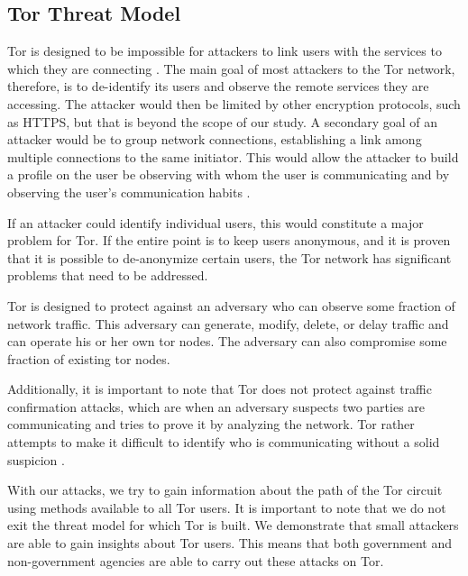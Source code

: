 \documentclass[12pt,journal]{IEEEtran}
\begin{document}
\subsection{Tor Threat Model}
Tor is designed to be impossible for attackers to link users with the services to which they are connecting \cite{Dingledine:2004:TSO:1251375.1251396}. The main goal of most attackers to the Tor network, therefore, is to de-identify its users and observe the remote services they are accessing. The attacker would then be limited by other encryption protocols, such as HTTPS, but that is beyond the scope of our study. A secondary goal of an attacker would be to group network connections, establishing a link among multiple connections to the same initiator. This would allow the attacker to build a profile on the user be observing with whom the user is communicating and by observing the user's communication habits \cite{Murdoch:2005:LTA:1058433.1059390}.
\par
If an attacker could identify individual users, this would constitute a major problem for Tor. If the entire point is to keep users anonymous, and it is proven that it is possible to de-anonymize certain users, the Tor network has significant problems that need to be addressed.
\par
Tor is designed to protect against an adversary who can observe some fraction of network traffic. This adversary can generate, modify, delete, or delay traffic and can operate his or her own tor nodes. The adversary can also compromise some fraction of existing tor nodes\cite{Dingledine:2004:TSO:1251375.1251396}.
\par
Additionally, it is important to note that Tor does not protect against traffic confirmation attacks, which are when an adversary suspects two parties are communicating and tries to prove it by analyzing the network. Tor rather attempts to make it difficult to identify who is communicating without a solid suspicion \cite{Murdoch:2005:LTA:1058433.1059390}.
\par
With our attacks, we try to gain information about the path of the Tor circuit using methods available to all Tor users. It is important to note that we do not exit the threat model for which Tor is built. We demonstrate that small attackers are able to gain insights about Tor users. This means that both government and non-government agencies are able to carry out these attacks on Tor.
\end{document}
